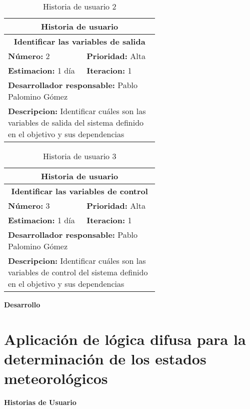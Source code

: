 \begin{table}[H]
        \centering
        \begin{tabular}{|p{0.3\linewidth}|p{0.3\linewidth}|}
          \hline
          \multicolumn{2}{|c|}{Historia de usuario}\\ \hline
          \multicolumn{2}{|c|}{\textbf{Identificar las variables de salida}}\\ \hline
          \textbf{Número:} 2 & \textbf{Prioridad:} Alta\\ \hline
          \textbf{Estimacion:} 1 día & \textbf{Iteracion:} 1\\ \hline
          \multicolumn{2}{|l|}{\textbf{Desarrollador responsable:} Pablo Palomino Gómez}\\ \hline
          \multicolumn{2}{|p{0.6\linewidth}|}{\textbf{Descripcion:} Identificar cuáles son las variables de salida del sistema definido en el objetivo y sus dependencias}\\ \hline
        \end{tabular}
        \caption{Historia de usuario 2}
        \label{tab:hist2}
\end{table}
\begin{table}[H]
        \centering
        \begin{tabular}{|p{0.3\linewidth}|p{0.3\linewidth}|}
          \hline
          \multicolumn{2}{|c|}{Historia de usuario}\\ \hline
          \multicolumn{2}{|c|}{\textbf{Identificar las variables de control}}\\ \hline
          \textbf{Número:} 3 & \textbf{Prioridad:} Alta\\ \hline
          \textbf{Estimacion:} 1 día & \textbf{Iteracion:} 1\\ \hline
          \multicolumn{2}{|l|}{\textbf{Desarrollador responsable:} Pablo Palomino Gómez}\\ \hline
          \multicolumn{2}{|p{0.6\linewidth}|}{\textbf{Descripcion:} Identificar cuáles son las variables de control del sistema definido en el objetivo y sus dependencias}\\ \hline
        \end{tabular}
        \caption{Historia de usuario 3}
        \label{tab:hist3}
\end{table}
\textbf{Desarrollo}\\


\section{Aplicación de lógica difusa para la determinación de los estados meteorológicos}
\textbf{Historias de Usuario}\\

